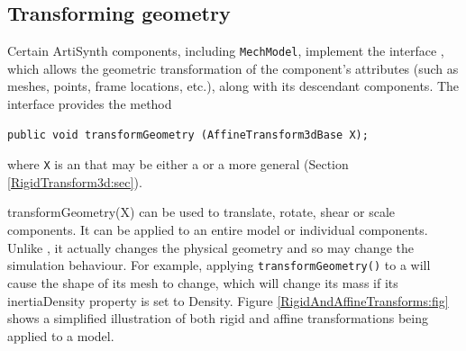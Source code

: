 \subsection{Transforming geometry}
\label{TransformingGeometry:sec}

Certain ArtiSynth components, including {\tt MechModel}, implement the
interface ,
which allows the geometric transformation of the component's
attributes (such as meshes, points, frame locations, etc.), along with
its descendant components. The interface provides the method
%
\begin{lstlisting}[]
   public void transformGeometry (AffineTransform3dBase X);
\end{lstlisting}
%
where {\tt X} is an 
that may be either a  or a
more general  (Section
\ref{RigidTransform3d:sec}).

%
{transformGeometry(X)}
can be used to translate, rotate, shear or scale components. It
can be applied to an entire model or individual components. Unlike
, it
actually changes the physical geometry and so may change the
simulation behaviour. For example, applying {\tt transformGeometry()}
to a  will cause the
shape of its mesh to change, which will change its mass if its {\sf
inertiaDensity} property is set to {\sf Density}.
Figure \ref{RigidAndAffineTransforms:fig} shows a simplified
illustration of both rigid and affine transformations being applied to
a model.

